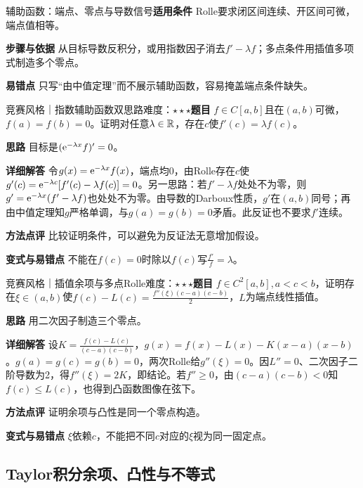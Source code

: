 \begin{method}{辅助函数：端点、零点与导数信号}\textbf{适用条件} Rolle要求闭区间连续、开区间可微，端点值相等。\par\textbf{步骤与依据} 从目标导数反积分，或用指数因子消去$f'-\lambda f$；多点条件用插值多项式制造多个零点。\par\textbf{易错点} 只写“由中值定理”而不展示辅助函数，容易掩盖端点条件缺失。\end{method}

\begin{example}{竞赛风格｜指数辅助函数双思路}{难度：$\star\star\star$}\label{deep:ex:differential_source_deep:auxiliary}\textbf{题目} $f\in C[a,b]$且在$(a,b)$可微，$f(a)=f(b)=0$。证明对任意$\lambda\in\mathbb{R}$，存在$c$使$f'(c)=\lambda f(c)$。\par\textbf{思路} 目标是$(\mathrm{e}^{-\lambda x}f)'=0$。\par\textbf{详细解答} 令$g(x)=\mathrm{e}^{-\lambda x}f(x)$，端点均0，由Rolle存在$c$使$g'(c)=\mathrm{e}^{-\lambda c}[f'(c)-\lambda f(c)]=0$。另一思路：若$f'-\lambda f$处处不为零，则$g'=\mathrm{e}^{-\lambda x}(f'-\lambda f)$也处处不为零。由导数的Darboux性质，$g'$在$(a,b)$同号；再由中值定理知$g$严格单调，与$g(a)=g(b)=0$矛盾。此反证也不要求$f'$连续。\par\textbf{方法点评} 比较证明条件，可以避免为反证法无意增加假设。\par\textbf{变式与易错点} 不能在$f(c)=0$时除以$f(c)$写$\frac{f'}{f}=\lambda$。\end{example}

\begin{example}{竞赛风格｜插值余项与多点Rolle}{难度：$\star\star\star$}\label{deep:ex:differential_source_deep:interpolation}\textbf{题目} $f\in C^2[a,b],a<c<b$，证明存在$\xi\in(a,b)$使$f(c)-L(c)=\frac{f''(\xi)(c-a)(c-b)}{2}$，$L$为端点线性插值。\par\textbf{思路} 用二次因子制造三个零点。\par\textbf{详细解答} 设$K=\frac{f(c)-L(c)}{(c-a)(c-b)}$，$g(x)=f(x)-L(x)-K(x-a)(x-b)$。$g(a)=g(c)=g(b)=0$，两次Rolle给$g''(\xi)=0$。因$L''=0$、二次因子二阶导数为2，得$f''(\xi)=2K$，即结论。若$f''\ge0$，由$(c-a)(c-b)<0$知$f(c)\le L(c)$，也得到凸函数图像在弦下。\par\textbf{方法点评} 证明余项与凸性是同一个零点构造。\par\textbf{变式与易错点} $\xi$依赖$c$，不能把不同$c$对应的$\xi$视为同一固定点。\end{example}

\subsection{Taylor积分余项、凸性与不等式}\label{deep:differential_source_deep:taylor}

